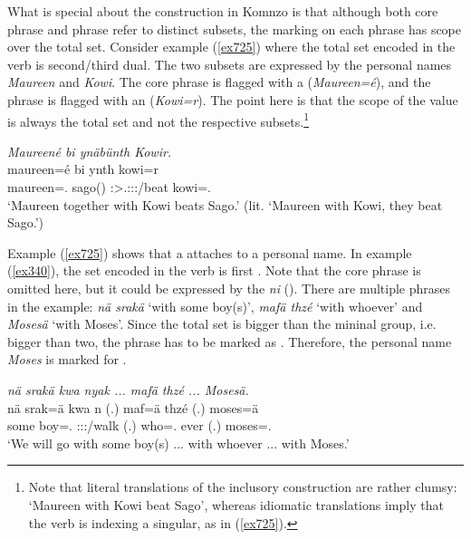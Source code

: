 What is special about the  construction in Komnzo is that although both core phrase and  phrase refer to distinct subsets, the  marking on each phrase has scope over the total set. Consider example (\ref{ex725}) where the total set encoded in the verb is second/third dual. The two subsets are expressed by the personal names \emph{Maureen} and \emph{Kowi}. The core phrase is flagged with a   (\emph{Maureen=é}), and the  phrase is flagged with an   (\emph{Kowi=r}). The point here is that the scope of the  value is always the total set and not the respective subsets.\footnote{Note that literal translations of the inclusory construction are rather clumsy: `Maureen with Kowi beat Sago', whereas idiomatic  translations imply that the verb is indexing a singular, as in (\ref{ex725}).}

\begin{exe}
	\ex \emph{Maureené bi ynäbünth Kowir.}\\
	\gll maureen=é bi ynth kowi=r\\
	maureen=\Erg.{\Nsg} sago(\Abs) \Stdu:\Sbj>\Tsg.\Masc:\Obj:\Nonpast:\Ipfv/beat kowi=\Assoc.{\Du}\\
	\trans `Maureen together with Kowi beats Sago.' (lit. `Maureen with Kowi, they beat Sago.')
	\label{ex725}
\end{exe}

Example (\ref{ex725}) shows that a  attaches to a personal name. In example (\ref{ex340}), the set encoded in the verb is first . Note that the core phrase is omitted here, but it could be expressed by the  \emph{ni} (\Fnsg). There are multiple  phrases in the example: \emph{nä srakä} `with some boy(s)', \emph{mafä thzé} `with whoever' and \emph{Mosesä} `with Moses'. Since the total set is bigger than the mininal group, i.e. bigger than two, the  phrase has to be marked as . Therefore, the personal name \emph{Moses} is marked for .

\begin{exe}
	\ex \emph{nä srakä kwa nyak ... mafä thzé ... Mosesä.}\\
	\gll nä srak=ä kwa n (.) maf=ä thzé (.) moses=ä\\
	some boy=\Assoc.{\Pl} {\Fut} \Fpl:\Sbj:\Nonpast:\Ipfv/walk (.) who=\Assoc.{\Pl} ever (.) moses=\Assoc.\Pl\\
	\trans `We will go with some boy(s) ... with whoever ... with Moses.'\\
	\label{ex340}
\end{exe}

